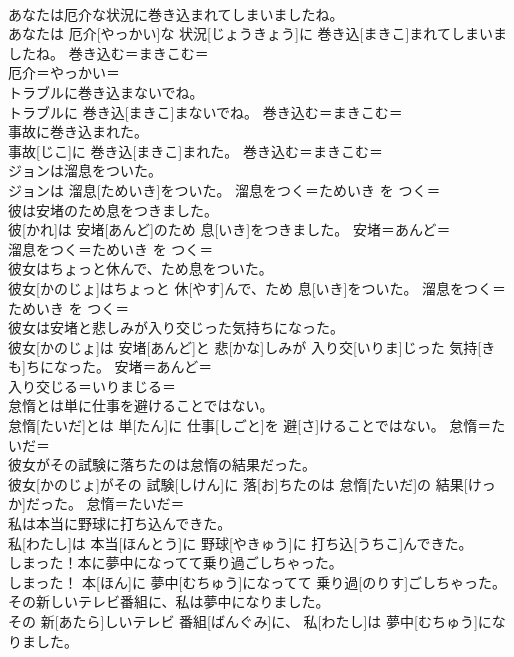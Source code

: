 \documentclass[8pt]{extreport}
\begin{document}
\begin{CJK}{UTF8}{min}
\\	あなたは厄介な状況に巻き込まれてしまいましたね。	
\\	あなたは 厄介[やっかい]な 状況[じょうきょう]に 巻き込[まきこ]まれてしまいましたね。	巻き込む＝まきこむ＝ 
\\	厄介＝やっかい＝ 
\\	トラブルに巻き込まないでね。	
\\	トラブルに 巻き込[まきこ]まないでね。	巻き込む＝まきこむ＝ 
\\	事故に巻き込まれた。	
\\	事故[じこ]に 巻き込[まきこ]まれた。	巻き込む＝まきこむ＝ 
\\	ジョンは溜息をついた。	
\\	ジョンは 溜息[ためいき]をついた。	溜息をつく＝ためいき を つく＝ 
\\	彼は安堵のため息をつきました。	
\\	彼[かれ]は 安堵[あんど]のため 息[いき]をつきました。	安堵＝あんど＝ 
\\	溜息をつく＝ためいき を つく＝ 
\\	彼女はちょっと休んで、ため息をついた。	
\\	彼女[かのじょ]はちょっと 休[やす]んで、ため 息[いき]をついた。	溜息をつく＝ためいき を つく＝ 
\\	彼女は安堵と悲しみが入り交じった気持ちになった。	
\\	彼女[かのじょ]は 安堵[あんど]と 悲[かな]しみが 入り交[いりま]じった 気持[きも]ちになった。	安堵＝あんど＝ 
\\	入り交じる＝いりまじる＝ 
\\	怠惰とは単に仕事を避けることではない。	
\\	怠惰[たいだ]とは 単[たん]に 仕事[しごと]を 避[さ]けることではない。	怠惰＝たいだ＝ 
\\	彼女がその試験に落ちたのは怠惰の結果だった。	
\\	彼女[かのじょ]がその 試験[しけん]に 落[お]ちたのは 怠惰[たいだ]の 結果[けっか]だった。	怠惰＝たいだ＝ 
\\	私は本当に野球に打ち込んできた。	
\\	私[わたし]は 本当[ほんとう]に 野球[やきゅう]に 打ち込[うちこ]んできた。	
\\	しまった！本に夢中になってて乗り過ごしちゃった。	
\\	しまった！ 本[ほん]に 夢中[むちゅう]になってて 乗り過[のりす]ごしちゃった。	
\\	その新しいテレビ番組に、私は夢中になりました。	
\\	その 新[あたら]しいテレビ 番組[ばんぐみ]に、 私[わたし]は 夢中[むちゅう]になりました。	

\end{CJK}
\end{document}

